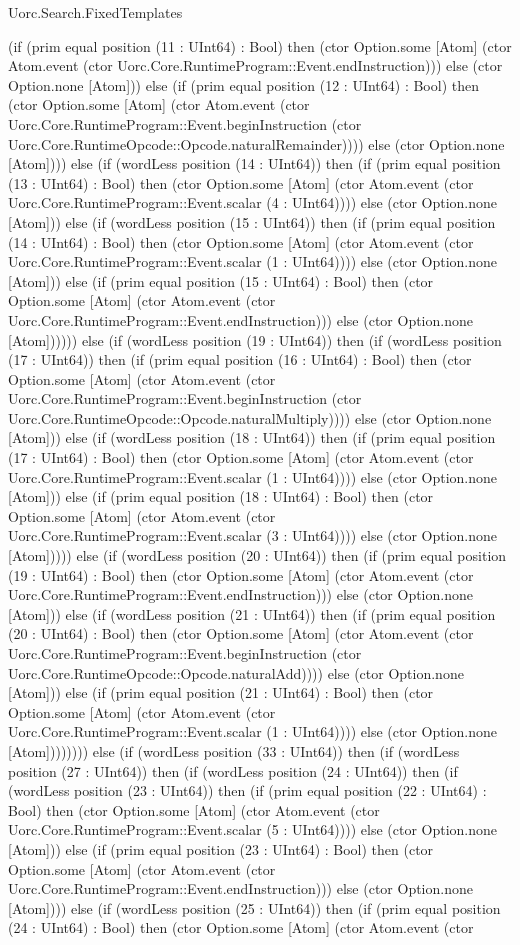 \begin{lexlean}{Uorc.Search.FixedTemplates}
\begin{semanticmodule}
{(if (prim equal position (11 : UInt64) : Bool) then (ctor Option.some [Atom] (ctor Atom.event (ctor Uorc.Core.RuntimeProgram::Event.endInstruction))) else (ctor Option.none [Atom])) else (if (prim equal position (12 : UInt64) : Bool) then (ctor Option.some [Atom] (ctor Atom.event (ctor Uorc.Core.RuntimeProgram::Event.beginInstruction (ctor Uorc.Core.RuntimeOpcode::Opcode.naturalRemainder)))) else (ctor Option.none [Atom]))) else (if (wordLess position (14 : UInt64)) then (if (prim equal position (13 : UInt64) : Bool) then (ctor Option.some [Atom] (ctor Atom.event (ctor Uorc.Core.RuntimeProgram::Event.scalar (4 : UInt64)))) else (ctor Option.none [Atom])) else (if (wordLess position (15 : UInt64)) then (if (prim equal position (14 : UInt64) : Bool) then (ctor Option.some [Atom] (ctor Atom.event (ctor Uorc.Core.RuntimeProgram::Event.scalar (1 : UInt64)))) else (ctor Option.none [Atom])) else (if (prim equal position (15 : UInt64) : Bool) then (ctor Option.some [Atom] (ctor Atom.event (ctor Uorc.Core.RuntimeProgram::Event.endInstruction))) else (ctor Option.none [Atom]))))) else (if (wordLess position (19 : UInt64)) then (if (wordLess position (17 : UInt64)) then (if (prim equal position (16 : UInt64) : Bool) then (ctor Option.some [Atom] (ctor Atom.event (ctor Uorc.Core.RuntimeProgram::Event.beginInstruction (ctor Uorc.Core.RuntimeOpcode::Opcode.naturalMultiply)))) else (ctor Option.none [Atom])) else (if (wordLess position (18 : UInt64)) then (if (prim equal position (17 : UInt64) : Bool) then (ctor Option.some [Atom] (ctor Atom.event (ctor Uorc.Core.RuntimeProgram::Event.scalar (1 : UInt64)))) else (ctor Option.none [Atom])) else (if (prim equal position (18 : UInt64) : Bool) then (ctor Option.some [Atom] (ctor Atom.event (ctor Uorc.Core.RuntimeProgram::Event.scalar (3 : UInt64)))) else (ctor Option.none [Atom])))) else (if (wordLess position (20 : UInt64)) then (if (prim equal position (19 : UInt64) : Bool) then (ctor Option.some [Atom] (ctor Atom.event (ctor Uorc.Core.RuntimeProgram::Event.endInstruction))) else (ctor Option.none [Atom])) else (if (wordLess position (21 : UInt64)) then (if (prim equal position (20 : UInt64) : Bool) then (ctor Option.some [Atom] (ctor Atom.event (ctor Uorc.Core.RuntimeProgram::Event.beginInstruction (ctor Uorc.Core.RuntimeOpcode::Opcode.naturalAdd)))) else (ctor Option.none [Atom])) else (if (prim equal position (21 : UInt64) : Bool) then (ctor Option.some [Atom] (ctor Atom.event (ctor Uorc.Core.RuntimeProgram::Event.scalar (1 : UInt64)))) else (ctor Option.none [Atom]))))))) else (if (wordLess position (33 : UInt64)) then (if (wordLess position (27 : UInt64)) then (if (wordLess position (24 : UInt64)) then (if (wordLess position (23 : UInt64)) then (if (prim equal position (22 : UInt64) : Bool) then (ctor Option.some [Atom] (ctor Atom.event (ctor Uorc.Core.RuntimeProgram::Event.scalar (5 : UInt64)))) else (ctor Option.none [Atom])) else (if (prim equal position (23 : UInt64) : Bool) then (ctor Option.some [Atom] (ctor Atom.event (ctor Uorc.Core.RuntimeProgram::Event.endInstruction))) else (ctor Option.none [Atom]))) else (if (wordLess position (25 : UInt64)) then (if (prim equal position (24 : UInt64) : Bool) then (ctor Option.some [Atom] (ctor Atom.event (ctor }
\end{semanticmodule}
\end{lexlean}
